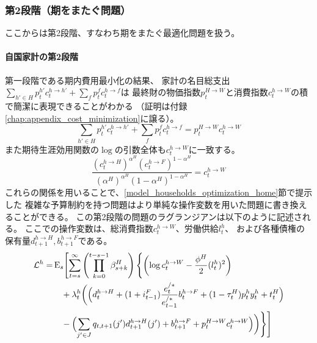 \subsubsection{第2段階（期をまたぐ問題）}
\label{sec:model_households_indices_aggregation_stage2}
ここからは第2段階、すなわち期をまたぐ最適化問題を扱う。

\paragraph{自国家計の第2段階}
\label{sec:model_households_indices_aggregation_stage2_home}
第一段階である期内費用最小化の結果、
家計の名目総支出\(\sum_{h'\in H}p_t^{h'}c_t^{h\to h'}+\sum_fp_t^fc_t^{h\to f}\)は
最終財の物価指数\(p_t^{H\to W}\)と消費指数\(c_t^{h\to W}\)の積で簡潔に表現できることがわかる
（証明は付録\ref{chap:appendix_cost_minimization}に譲る）。
\begin{equation}
\label{form:model_households_indices_aggregation_stage2_home_p_H_W_c_h_W_eq}
    \sum_{h'\in H}p_t^{h'}c_t^{h\to h'}+\sum_fp_t^fc_t^{h\to f}=p_t^{H\to W}c_t^{h\to W}
\end{equation}
また期待生涯効用関数の\(\log\)の引数全体も\(c_t^{h\to W}\)に一致する。
\begin{equation}
\label{form:model_households_indices_aggregation_stage2_home_c_h_W_eq}
    \frac{(c_t^{h\to H})^{\alpha^H}(c_t^{h\to F})^{1-\alpha^H}}{(\alpha^H)^{\alpha^H}(1-\alpha^H)^{1-\alpha^H}}=c_t^{h\to W}
\end{equation}
これらの関係を用いることで、\ref{model_households_optimization_home}節で提示した
複雑な予算制約を持つ問題はより単純な操作変数を用いた問題に書き換えることができる。
この第2段階の問題のラグランジアンは以下のように記述される。
ここでの操作変数は、総消費指数\(c_t^{h\to W}\)、労働供給\(l_t^h\)、
および各種債権の保有量\(d_{t+1}^{h\to H},b_{t+1}^{h\to F}\)である。
\begin{equation}
\label{form:model_households_indices_aggregation_stage2_home_lagrangian_eq}
    \begin{aligned}
        \mathcal{L}^h=&\operatorname{E}_s\Biggl[\sum_{t=s}^{\infty}\left(\prod_{k=0}^{t-s-1}\beta_{s+k}^H\right)\Biggl\{\left(\log c_t^{h\to W}-\frac{\phi^H}{2}(l_t^h)^2\right) \\
        &\quad+\lambda_t^h\biggl(\Bigl(d_t^{h\to H}+(1+i_{t-1}^F)\frac{e_t^{/*}}{e_{t-1}^{/*}}b_t^{h\to F}+(1-\tau_t^H)p_t^hy_t^h+t_t^H\Bigr) \\
        &\quad-\Bigl(\sum_{j'\in J}q_{t,t+1}(j')d_{t+1}^{h\to H}(j')+b_{t+1}^{h\to F}+p_t^{H\to W}c_t^{h\to W}\Bigr)\biggr)\Biggr\}\Biggr]
    \end{aligned}
\end{equation}
